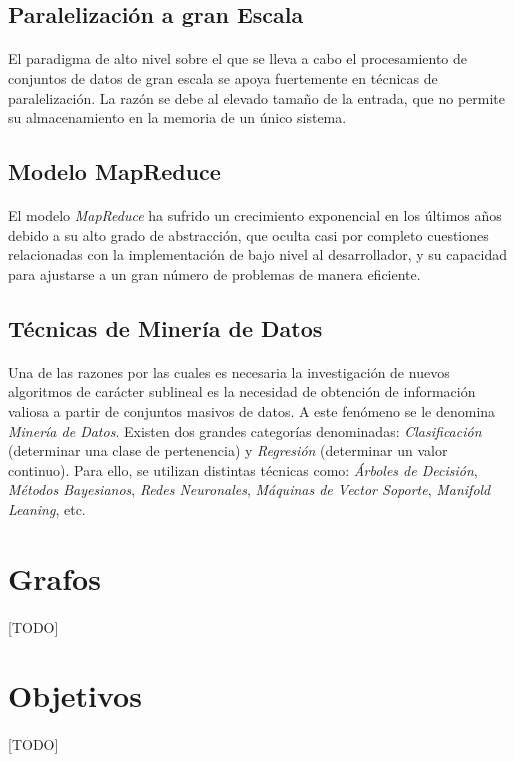 \documentclass{subfiles}
\begin{document}
      \subsection{Paralelización a gran Escala}

        \paragraph{}
        El paradigma de alto nivel sobre el que se lleva a cabo el procesamiento de conjuntos de datos de gran escala se apoya fuertemente en técnicas de paralelización. La razón se debe al elevado tamaño de la entrada, que no permite su almacenamiento en la memoria de un único sistema.

        \subsection{Modelo MapReduce}

          \paragraph{}
          El modelo \emph{MapReduce} ha sufrido un crecimiento exponencial en los últimos años debido a su alto grado de abstracción, que oculta casi por completo cuestiones relacionadas con la implementación de bajo nivel al desarrollador, y su capacidad para ajustarse a un gran número de problemas de manera eficiente.

      \subsection{Técnicas de Minería de Datos}

        \paragraph{}
        Una de las razones por las cuales es necesaria la investigación de nuevos algoritmos de carácter sublineal es la necesidad de obtención de información valiosa a partir de conjuntos masivos de datos. A este fenómeno se le denomina \emph{Minería de Datos}. Existen dos grandes categorías denominadas: \emph{Clasificación} (determinar una clase de pertenencia) y \emph{Regresión} (determinar un valor continuo). Para ello, se utilizan distintas técnicas como: \emph{Árboles de Decisión}, \emph{Métodos Bayesianos}, \emph{Redes Neuronales}, \emph{Máquinas de Vector Soporte}, \emph{Manifold Leaning}, etc.

    \section{Grafos}
    \label{sec:introduction_graphs}

      \paragraph{}
      [TODO]

    \section{Objetivos}
    \label{sec:introduction_goals}

      \paragraph{}
      [TODO]
\end{document}
